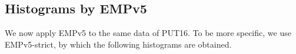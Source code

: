 \documentclass[10pt]{article}
\begin{document}
\clearpage
\newpage

\subsection{Histograms by EMPv5~\label{sec:put16_empv5}}
We now apply EMPv5 to the same data of PUT16. 
To be more specific, we use EMPv5-strict, 
by which the following histograms are obtained.

\begin{figure}[hp!]
	\centering
\end{figure}
\end{document}
